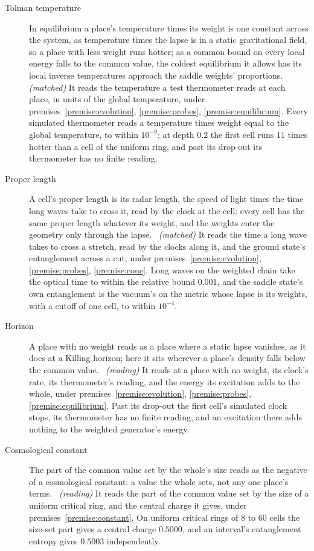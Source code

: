 \begin{description}
  \item[Tolman temperature] In equilibrium a place's temperature times its weight is one constant across the system, as temperature times the lapse is in a static gravitational field, so a place with less weight runs hotter; as a common bound on every local energy falls to the common value, the coldest equilibrium it allows has its local inverse temperatures approach the saddle weights' proportions.~\cite{Tolman1930} \emph{(matched)} It reads the temperature a test thermometer reads at each place, in units of the global temperature, under premises~\ref{premise:evolution}, \ref{premise:probes}, \ref{premise:equilibrium}. Every simulated thermometer reads a temperature times weight equal to the global temperature, to within $10^{-9}$; at depth $0.2$ the first cell runs $11$ times hotter than a cell of the uniform ring, and past its drop-out its thermometer has no finite reading.
  \item[Proper length] A cell's proper length is its radar length, the speed of light times the time long waves take to cross it, read by the clock at the cell: every cell has the same proper length whatever its weight, and the weights enter the geometry only through the lapse.~\cite{DubailEtAl2017} \emph{(matched)} It reads the time a long wave takes to cross a stretch, read by the clocks along it, and the ground state's entanglement across a cut, under premises~\ref{premise:evolution}, \ref{premise:probes}, \ref{premise:cone}. Long waves on the weighted chain take the optical time to within the relative bound $0.001$, and the saddle state's own entanglement is the vacuum's on the metric whose lapse is its weights, with a cutoff of one cell, to within $10^{-4}$.
  \item[Horizon] A place with no weight reads as a place where a static lapse vanishes, as it does at a Killing horizon; here it sits wherever a place's density falls below the common value.~\cite{Gourgoulhon2007} \emph{(reading)} It reads at a place with no weight, its clock's rate, its thermometer's reading, and the energy its excitation adds to the whole, under premises~\ref{premise:evolution}, \ref{premise:probes}, \ref{premise:equilibrium}. Past its drop-out the first cell's simulated clock stops, its thermometer has no finite reading, and an excitation there adds nothing to the weighted generator's energy.
  \item[Cosmological constant] The part of the common value set by the whole's size reads as the negative of a cosmological constant: a value the whole sets, not any one place's terms.~\cite{HenneauxTeitelboim1989} \emph{(reading)} It reads the part of the common value set by the size of a uniform critical ring, and the central charge it gives, under premises~\ref{premise:constant}. On uniform critical rings of $8$ to $60$ cells the size-set part gives a central charge $0.5000$, and an interval's entanglement entropy gives $0.5003$ independently.

\end{description}
